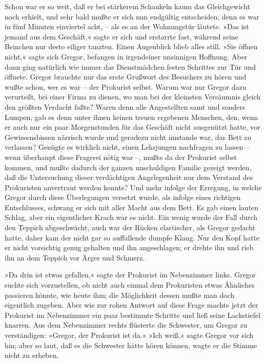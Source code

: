 Schon war er so weit, daß er bei stärkerem Schaukeln kaum das
Gleichgewicht noch erhielt, und sehr bald mußte er sich nun endgültig
entscheiden, denn es war in fünf Minuten einviertel acht, -- als es an
der Wohnungstür läutete. »Das ist jemand aus dem Geschäft,« sagte er
sich und erstarrte fast, während seine Beinchen nur desto eiliger
tanzten. Einen Augenblick blieb alles still. »Sie öffnen nicht,« sagte
sich Gregor, befangen in irgendeiner unsinnigen Hoffnung. Aber dann ging
natürlich wie immer das Dienstmädchen festen Schrittes zur Tür und
öffnete. Gregor brauchte nur das erste Grußwort des Besuchers zu hören
und wußte schon, wer es war -- der Prokurist selbst. Warum war nur
Gregor dazu verurteilt, bei einer Firma zu dienen, wo man bei der
kleinsten Versäumnis gleich den größten Verdacht faßte? Waren denn alle
Angestellten samt und sonders Lumpen, gab es denn unter ihnen keinen
treuen ergebenen Menschen, den, wenn er auch nur ein paar Morgenstunden
für das Geschäft nicht ausgenützt hatte, vor Gewissensbissen närrisch
wurde und geradezu nicht imstande war, das Bett zu verlassen? Genügte es
wirklich nicht, einen Lehrjungen nachfragen zu lassen -- wenn überhaupt
diese Fragerei nötig war --, mußte da der Prokurist selbst kommen, und
mußte dadurch der ganzen unschuldigen Familie gezeigt werden, daß die
Untersuchung dieser verdächtigen Angelegenheit nur dem Verstand des
Prokuristen anvertraut werden konnte? Und mehr infolge der Erregung, in
welche Gregor durch diese Überlegungen versetzt wurde, als infolge eines
richtigen Entschlusses, schwang er sich mit aller Macht aus dem Bett. Es
gab einen lauten Schlag, aber ein eigentlicher Krach war es nicht. Ein
wenig wurde der Fall durch den Teppich abgeschwächt, auch war der Rücken
elastischer, als Gregor gedacht hatte, daher kam der nicht gar so
auffallende dumpfe Klang. Nur den Kopf hatte er nicht vorsichtig genug
gehalten und ihn angeschlagen; er drehte ihn und rieb ihn an dem Teppich
vor Ärger und Schmerz.

»Da drin ist etwas gefallen,« sagte der Prokurist im Nebenzimmer links.
Gregor suchte sich vorzustellen, ob nicht auch einmal dem Prokuristen
etwas Ähnliches passieren könnte, wie heute ihm; die Möglichkeit dessen
mußte man doch eigentlich zugeben. Aber wie zur rohen Antwort auf diese
Frage machte jetzt der Prokurist im Nebenzimmer ein paar bestimmte
Schritte und ließ seine Lackstiefel knarren. Aus dem Nebenzimmer rechts
flüsterte die Schwester, um Gregor zu verständigen: »Gregor, der
Prokurist ist da.« »Ich weiß,« sagte Gregor vor sich hin; aber so laut,
daß es die Schwester hätte hören können, wagte er die Stimme nicht zu
erheben.

